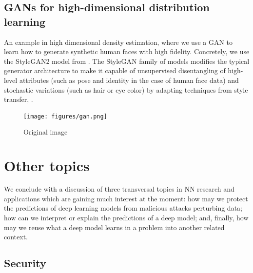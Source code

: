 \subsection{GANs for high-dimensional distribution learning}
An example in high dimensional density estimation, where we use a GAN to learn how to generate synthetic human faces with high fidelity. Concretely, we use the StyleGAN2 model from \citep{Karras2019stylegan2}. The StyleGAN family of models modifies the typical generator architecture to make it capable of unsupervised disentangling of high-level attributes (such as pose and identity in the case of human face data) and stochastic variations (such as hair or eye color) by adapting techniques from style transfer, \cite{karras2019style,jing2019neural}.







\begin{figure}[!h]
\centering
  \texttt{[image: figures/gan.png]}
  \caption{Original image}
  \label{fig:gan}
\end{figure}






\section{Other topics}
We conclude with a discussion of three transversal topics in NN
research and applications which are gaining much interest at the moment: how may we protect the predictions of deep
learning models from malicious attacks perturbing data; how can we interpret or explain the predictions of a deep model; and, finally, how may we reuse what a deep model
learns in a problem into another related context. 

\subsection{Security}

